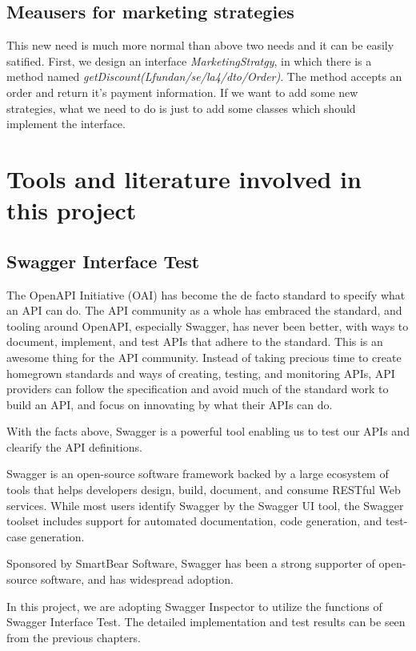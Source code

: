 \documentclass[a4paper]{report}
\begin{document}
\section{Meausers for marketing strategies}
\par This new need is much more normal than above two needs and it can be easily satified. First, we design an interface \emph{MarketingStratgy}, in which there is a method named \emph{getDiscount(Lfundan/se/la4/dto/Order)}. The method accepts an order and return it's payment information. If we want to add some new strategies, what we need to do is just to add some classes which should implement the interface.

\chapter{Tools and literature involved in this project}
\section{Swagger Interface Test}
The OpenAPI Initiative (OAI) has become the de facto standard to specify what an API can do. The API community as a whole has embraced the standard, and tooling around OpenAPI, especially Swagger, has never been better, with ways to document, implement, and test APIs that adhere to the standard. This is an awesome thing for the API community. Instead of taking precious time to create homegrown standards and ways of creating, testing, and monitoring APIs, API providers can follow the specification and avoid much of the standard work to build an API, and focus on innovating by what their APIs can do.
\par
With the facts above, Swagger is a powerful tool enabling us to test our APIs and clearify the API definitions.
\par
Swagger is an open-source software framework backed by a large ecosystem of tools that helps developers design, build, document, and consume RESTful Web services. While most users identify Swagger by the Swagger UI tool, the Swagger toolset includes support for automated documentation, code generation, and test-case generation. 
\par
Sponsored by SmartBear Software, Swagger has been a strong supporter of open-source software, and has widespread adoption. 
\par
In this project, we are adopting Swagger Inspector to utilize the functions of Swagger Interface Test. The detailed implementation and test results can be seen from the previous chapters.
\end{document}
